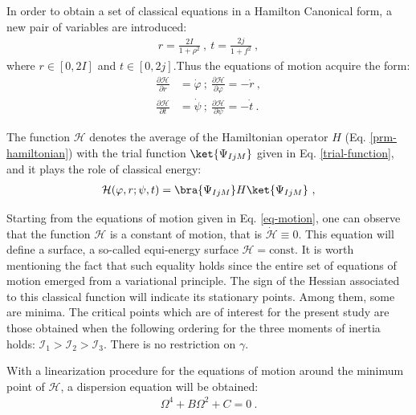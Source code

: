 \documentclass[myclassdoc,debug]{rjparticle}
\begin{document}
In order to obtain a set of classical equations in a Hamilton Canonical form, a new pair of variables are introduced: 
\begin{align}
    r=\frac{2I}{1+\rho^2}\ ,\ t=\frac{2j}{1+f^2}\ ,
\end{align}
where $r\in\left[0,2I\right]$ and $t\in\left[0,2j\right]$.Thus the equations of motion acquire the form:
\begin{align}
    \frac{\partial\mathcal{H}}{\partial r}&=\dot{\varphi}\ ;\ \frac{\partial\mathcal{H}}{\partial \varphi}=-\dot{r}\ , \nonumber\\
    \frac{\partial\mathcal{H}}{\partial t}&=\dot{\psi}\ ;\ \frac{\partial\mathcal{H}}{\partial \psi}=-\dot{t}\ .
    \label{eq-motion}
\end{align}

The function $\mathcal{H}$ denotes the average of the Hamiltonian operator $H$ (Eq. \ref{prm-hamiltonian}) with the trial function $\ket{\Psi_{IjM}}$ given in Eq. \ref{trial-function}, and it plays the role of classical energy:
\begin{align}
    \mathcal{H}(\varphi,r;\psi,t)=\bra{\Psi_{IjM}}H\ket{\Psi_{IjM}}\ ,
\end{align}

Starting from the equations of motion given in Eq. \ref{eq-motion}, one can observe that the function $\mathcal{H}$ is a constant of motion, that is $\dot{\mathcal{H}}\equiv0$. This equation will define a surface, a so-called equi-energy surface $\mathcal{H}=\text{const}$. It is worth mentioning the fact that such equality holds since the entire set of equations of motion emerged from a variational principle. The sign of the Hessian associated to this classical function will indicate its stationary points. Among them, some are minima. The critical points which are of interest for the present study are those obtained when the following ordering for the three moments of inertia holds: $\mathcal{I}_1>\mathcal{I}_2>\mathcal{I}_3$. There is no restriction on $\gamma$.

With a linearization procedure for the equations of motion around the minimum point  of $\mathcal{H}$, a dispersion equation will be obtained:
\begin{align}
    \Omega^4+B\Omega^2+C=0\ .
    \label{dispersion-eq}
\end{align}
\end{document}
